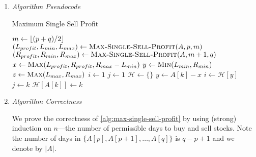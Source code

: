 \documentclass{article}
\begin{document}
\begin{enumerate}[leftmargin={*}, font={\bf}, label={\arabic*.}, ref={\arabic*}]
\begin{enumerate}
      \item \label{qst:4b}
        {\it Algorithm Pseudocode} \vspace{-\baselineskip}
        
        \begin{minipage}{\linewidth}
          \begin{algorithm}[H]
            \caption{Maximum Single Sell Profit}\label{alg:max-single-sell-profit}
            \begin{algorithmic}[1]
               
                  \State {}
                \EndIf
                \State $m \gets \lfloor(p + q) / 2\rfloor$
                \State $(L_{profit}, L_{min}, L_{max}) \gets \Call{Max-Single-Sell-Profit}{A, p, m}$
                \State $(R_{profit}, R_{min}, R_{max}) \gets \Call{Max-Single-Sell-Profit}{A, m + 1, q}$
                \State $x \gets \Call{Max}{L_{profit}, R_{profit}, R_{max} - L_{min}}$
                \State $y \gets \Call{Min}{L_{min}, R_{min}}$
                \State $z \gets \Call{Max}{L_{max}, R_{max}}$
                \State {}
              \EndFunction
              \State
               
                \State $i \gets 1$
                \State $j \gets 1$
                \State $\mathcal{H} \gets \{\}$ 
                  \State $y \gets A[k] - x$
                    \State $i \gets \mathcal{H}[y]$
                    \State $j \gets k$
                    \State {} 
                  \EndIf
                  \State $\mathcal{H}\left[A[k]\right] \gets k$
                \EndFor
                \State {} 
              \EndFunction
            \end{algorithmic}
          \end{algorithm}
        \end{minipage}

      \item \label{qst:4c}
        {\it Algorithm Correctness}

        We prove the correctness of \autoref{alg:max-single-sell-profit} by using (strong) induction
        on $n$---the number of permissible days to buy and sell stocks. Note the number of days in
        $\{A[p], A[p+1], \ldots, A[q]\}$ is $q - p  + 1$ and we denote by $|A|$.


\end{enumerate}
\end{enumerate}
\end{document}
